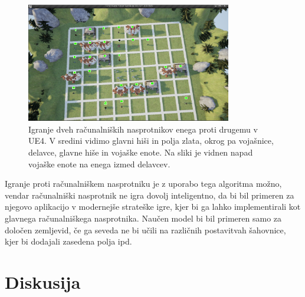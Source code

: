 \documentclass[a4paper, 12pt]{book}
\begin{document}
\begin{figure}[h]
	\begin{center}
		\includegraphics[width=0.8\textwidth]{photos/ue4attack.pdf}
	\end{center}
	\caption{Igranje dveh računalniških nasprotnikov enega proti drugemu v UE4. V sredini vidimo glavni hiši in polja zlata, okrog pa vojašnice, delavce, glavne hiše in vojaške enote.
		Na sliki je vidnen napad vojaške enote na enega izmed delavcev. }
	\label{visualization_ue4}
\end{figure}

Igranje proti računalniškem nasprotniku je z uporabo tega algoritma možno, vendar računalniški nasprotnik ne igra dovolj inteligentno, da bi bil primeren za njegovo aplikacijo v modernejše strateške igre, kjer bi ga lahko implementirali kot glavnega računalniškega nasprotnika.
Naučen model bi bil primeren samo za določen zemljevid, če ga seveda ne bi učili na različnih postavitvah šahovnice, kjer bi dodajali zasedena polja ipd.





\chapter{Diskusija}
\label{chdiskusija}
\end{document}
